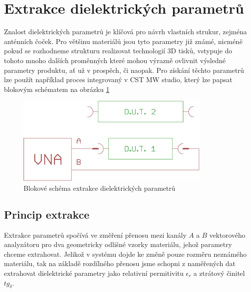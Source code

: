 \section{Extrakce dielektrických parametrů}
Znalost dielektrických parametrů je klíčová pro návrh vlastních strukur, zejména anténních čoček.
Pro většinu materiálů jsou tyto parametry již známé, nicméně pokud se rozhodneme strukturu realizovat technologií 3D tisků, vstypuje do tohoto mnoho dalších proměnných které mohou výrazně ovlivnit výsledné parametry produktu, ať už v prospěch, či naopak.
Pro získání těchto parametrů lze použít například proces integrovaný v CST MW studio, který lze papsat blokovým schématem na obrázku \ref{fig:ExtractBlock}
\begin{figure}[h]
\begin{center}
\includegraphics[width=9.5cm]{pics/ExtractBlock}
\caption{Blokové schéma extrakce dielektrických parametrů}
\label{fig:ExtractBlock}
\end{center}
\end{figure}
\subsection{Princip extrakce}
Extrakce parametrů spočívá ve změření přenosu mezi kanály $A$ a $B$ vektorového analyzátoru pro dva geometricky odlišné vzorky materiálu, jehož parametry chceme extrahovat. Jelikož v systému dojde ke změně pouze rozměru neznámého materiálu, tak na základě rozdílného přenosu jsme schopni z naměřených dat extrahovat dielektrické parametry jako relativní permitivitu $\epsilon_r$ a ztrátový činitel $tg_\delta$.
